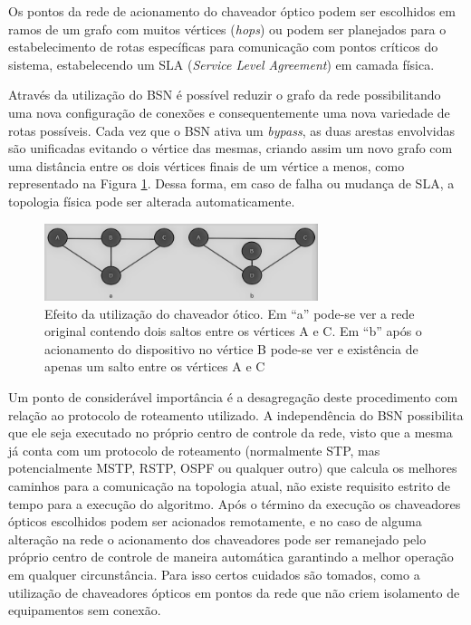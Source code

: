 \documentclass[12pt]{article}
\begin{document}
Os pontos da rede de acionamento do chaveador óptico podem ser escolhidos em ramos de um grafo com muitos vértices (\emph{hops}) ou podem ser planejados para o estabelecimento de rotas específicas para comunicação com pontos críticos do sistema, estabelecendo um SLA (\emph{Service Level Agreement}) em camada física.

Através da utilização do BSN é possível reduzir o grafo da rede possibilitando uma nova configuração de conexões e consequentemente uma nova variedade de rotas possíveis. Cada vez que o BSN ativa um \emph{bypass}, as duas arestas envolvidas são unificadas evitando o vértice das mesmas, criando assim um novo grafo com uma distância entre os dois vértices finais de um vértice a menos, como representado na Figura \ref{fig_bypass_exemplo}. Dessa forma, em caso de falha ou mudança de SLA, a topologia física pode ser alterada automaticamente.

\begin{figure} %
	\centering
	\includegraphics[width=8cm]{Bypass_exemplo_PB}
	\caption{Efeito da utilização do chaveador ótico. Em ``a'' pode-se ver a rede original contendo dois saltos entre os vértices A e C. Em ``b'' após o acionamento do dispositivo no vértice B pode-se ver e existência de apenas um salto entre os vértices A e C}
	\label{fig_bypass_exemplo}
\end{figure}

Um ponto de considerável importância é a desagregação deste procedimento com relação ao protocolo de roteamento utilizado. A independência do BSN possibilita que ele seja executado no próprio centro de controle da rede, visto que a mesma já conta com um protocolo de roteamento (normalmente STP, mas potencialmente MSTP, RSTP, OSPF ou qualquer outro) que calcula os melhores caminhos para a comunicação na topologia atual, não existe requisito estrito de tempo para a execução do algoritmo. Após o término da execução os chaveadores ópticos escolhidos podem ser acionados remotamente, e no caso de alguma alteração na rede o acionamento dos chaveadores pode ser remanejado pelo próprio centro de controle de maneira automática garantindo a melhor operação em qualquer circunstância. Para isso certos cuidados são tomados, como a utilização de chaveadores ópticos em pontos da rede que não criem isolamento de equipamentos sem conexão.
\end{document}
